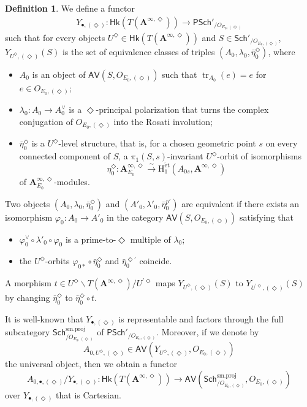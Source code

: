 \documentclass[12pt]{amsart}
\numberwithin{equation}{section}
\theoremstyle{plain}
\theoremstyle{definition}
\newtheorem{definition}[proposition]{Definition}
\theoremstyle{remark}
\renewcommand{\b}[1]{\mathbf{#1}}
\renewcommand{\r}[1]{\mathrm{#1}}
\renewcommand{\sf}[1]{\mathsf{#1}}
\renewcommand{\(}{\left(}
\renewcommand{\)}{\right)}
\newcommand{\bA}{\b A}
\newcommand{\rH}{\r H}
\newcommand{\sfP}{\sf P}
\newcommand{\et}{{\acute{\r{e}}\r{t}}}
\newcommand{\smp}{\r{sm.proj}}
\newcommand{\Sch}{\sf{Sch}}
\newcommand{\AV}{\sf{AV}}
\newcommand{\Hk}{\sf{Hk}}
\DeclareMathOperator{\tr}{tr}
\begin{document}
\begin{definition}\label{de:moduli_auxiliary_integral}
We define a functor
\begin{align*}
Y_{\bullet,(\Diamond)}\colon\Hk(T(\bA^{\infty,\Diamond}))\to\sfP\Sch'_{/O_{E_0,(\Diamond)}}
\end{align*}
such that for every objects $U^\Diamond\in\Hk(T(\bA^{\infty,\Diamond}))$ and $S\in\Sch'_{/O_{E_0,(\Diamond)}}$, $Y_{U^\Diamond,(\Diamond)}(S)$ is the set of equivalence classes of triples $(A_0,\lambda_0,\bar\eta_0^\Diamond)$, where
\begin{itemize}
  \item $A_0$ is an object of $\AV(S,O_{E_0,(\Diamond)})$ such that $\tr_{A_0}(e)=e$ for $e\in O_{E_0,(\Diamond)}$;

  \item $\lambda_0\colon A_0\to A_0^\vee$ is a $\Diamond$-principal polarization that turns the complex conjugation of $O_{E_0,(\Diamond)}$ into the Rosati involution;

  \item $\bar\eta_0^\Diamond$ is a $U^\Diamond$-level structure, that is, for a chosen geometric point $s$ on every connected component of $S$, a $\pi_1(S,s)$-invariant $U^\Diamond$-orbit of isomorphisms
      \[
      \eta_0^\Diamond\colon\bA_{E_0}^{\infty,\Diamond}\xrightarrow\sim\rH_1^{\et}(A_{0s},\bA^{\infty,\Diamond})
      \]
      of $\bA_{E_0}^{\infty,\Diamond}$-modules.
\end{itemize}
Two objects $(A_0,\lambda_0,\bar\eta_0^\Diamond)$ and $(A'_0,\lambda'_0,\bar\eta_0^{p\prime})$ are equivalent if there exists an isomorphism $\varphi_0\colon A_0\to A'_0$ in the category $\AV(S,O_{E_0,(\Diamond)})$ satisfying that
\begin{itemize}
  \item $\varphi_0^\vee\circ\lambda'_0\circ\varphi_0$ is a prime-to-$\Diamond$ multiple of $\lambda_0$;

  \item the $U^\Diamond$-orbits $\varphi_{0*}\circ\bar\eta_0^\Diamond$ and $\bar\eta_0^{\Diamond\prime}$ coincide.
\end{itemize}
A morphism $t\in U^\Diamond\backslash T(\bA^{\infty,\Diamond})/U^{\prime\Diamond}$ maps $Y_{U^\Diamond,(\Diamond)}(S)$ to $Y_{U^{\prime\Diamond},(\Diamond)}(S)$ by changing $\bar\eta_0^\Diamond$ to $\bar\eta_0^\Diamond\circ t$.
\end{definition}


It is well-known that $Y_{\bullet,(\Diamond)}$ is representable and factors through the full subcategory $\Sch^\smp_{/O_{E_0,(\Diamond)}}$ of $\sfP\Sch'_{/O_{E_0,(\Diamond)}}$. Moreover, if we denote by
\[
A_{0,U^\Diamond,(\Diamond)}\in\AV(Y_{U^\Diamond,(\Diamond)},O_{E_0,(\Diamond)})
\]
the universal object, then we obtain a functor
\[
A_{0,\bullet,(\Diamond)}/Y_{\bullet,(\Diamond)}\colon
\Hk(T(\bA^{\infty,\Diamond}))\to\AV(\Sch^\smp_{/O_{E_0,(\Diamond)}},O_{E_0,(\Diamond)})
\]
over $Y_{\bullet,(\Diamond)}$ that is Cartesian.
\end{document}
